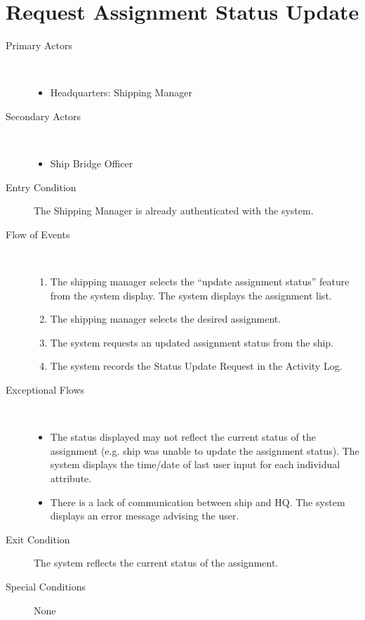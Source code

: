 \documentclass[a4paper,10pt]{report}
\begin{document}
\section{Request Assignment Status Update}
\begin{description}
\item[Primary Actors] \
  \begin{itemize}
    \item Headquarters: Shipping Manager
  \end{itemize}
\item[Secondary Actors] \
  \begin{itemize}
    \item Ship Bridge Officer
  \end{itemize}
\item[Entry Condition]
  The Shipping Manager is already authenticated with the system.
\item[Flow of Events] \
  \begin{enumerate}
    \item The shipping manager selects the ``update assignment status'' feature from the system display. The system displays the assignment list.
    \item The shipping manager selects the desired assignment. 
    \item The system requests an updated assignment status from the ship.
    \item The system records the Status Update Request in the Activity Log.
  \end{enumerate}
\item[Exceptional Flows] \
  \begin{itemize}
    \item The status displayed may not reflect the current status of the assignment (e.g. ship was unable to update the assignment status). The system displays the time/date of last user input for each individual attribute.
    \item There is a lack of communication between ship and HQ. The system displays an error message advising the user.
  \end{itemize}
\item[Exit Condition]
  The system reflects the current status of the assignment.
\item[Special Conditions] None
\end{description}
\end{document}
